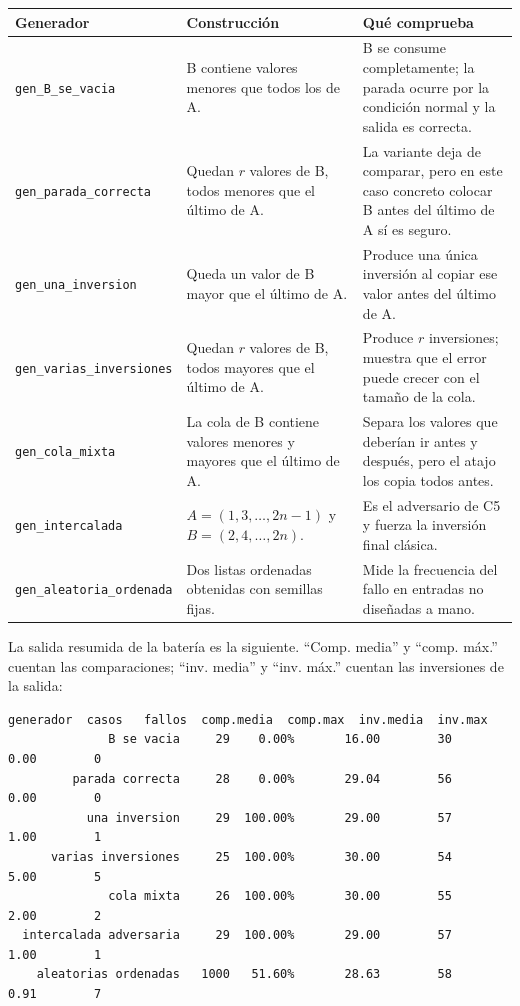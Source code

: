 \documentclass[11pt]{article}
\begin{document}
\begin{center}
\scriptsize
\renewcommand{\arraystretch}{1.16}
\begin{tabular}{>{\raggedright\arraybackslash}p{.20\linewidth}
                >{\raggedright\arraybackslash}p{.30\linewidth}
                >{\raggedright\arraybackslash}p{.32\linewidth}}
\toprule
\textbf{Generador} & \textbf{Construcción} & \textbf{Qué comprueba} \\
\midrule
\texttt{gen\_B\_se\_vacia} & B contiene valores menores que todos los de A. & B se consume completamente; la parada ocurre por la condición normal y la salida es correcta. \\
\texttt{gen\_parada\_correcta} & Quedan $r$ valores de B, todos menores que el último de A. & La variante deja de comparar, pero en este caso concreto colocar B antes del último de A sí es seguro. \\
\texttt{gen\_una\_inversion} & Queda un valor de B mayor que el último de A. & Produce una única inversión al copiar ese valor antes del último de A. \\
\texttt{gen\_varias\_inversiones} & Quedan $r$ valores de B, todos mayores que el último de A. & Produce $r$ inversiones; muestra que el error puede crecer con el tamaño de la cola. \\
\texttt{gen\_cola\_mixta} & La cola de B contiene valores menores y mayores que el último de A. & Separa los valores que deberían ir antes y después, pero el atajo los copia todos antes. \\
\texttt{gen\_intercalada} & $A=(1,3,\ldots,2n-1)$ y $B=(2,4,\ldots,2n)$. & Es el adversario de C5 y fuerza la inversión final clásica. \\
\texttt{gen\_aleatoria\_ordenada} & Dos listas ordenadas obtenidas con semillas fijas. & Mide la frecuencia del fallo en entradas no diseñadas a mano. \\
\bottomrule
\end{tabular}
\end{center}

\clearpage
La salida resumida de la batería es la siguiente. ``Comp. media'' y ``comp. máx.'' cuentan las
comparaciones; ``inv. media'' y ``inv. máx.'' cuentan las inversiones de la salida:

\begin{lstlisting}[style=salida]
               generador  casos   fallos  comp.media  comp.max  inv.media  inv.max
              B se vacia     29    0.00%       16.00        30       0.00        0
         parada correcta     28    0.00%       29.04        56       0.00        0
           una inversion     29  100.00%       29.00        57       1.00        1
      varias inversiones     25  100.00%       30.00        54       5.00        5
              cola mixta     26  100.00%       30.00        55       2.00        2
  intercalada adversaria     29  100.00%       29.00        57       1.00        1
    aleatorias ordenadas   1000   51.60%       28.63        58       0.91        7
\end{lstlisting}
\end{document}
